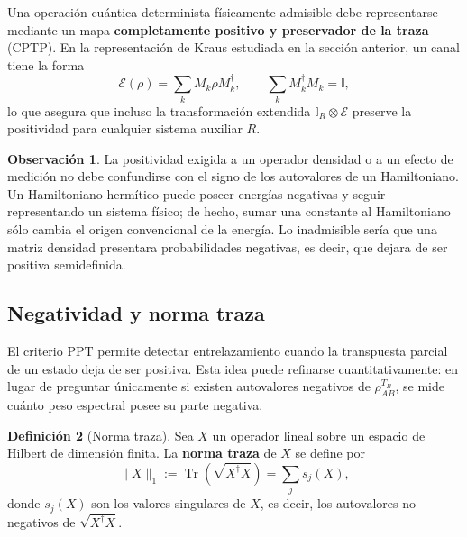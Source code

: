 \documentclass[12pt,a4paper]{article}
\theoremstyle{definition}
\newtheorem{definicion}{Definición}[section]
\newtheorem{observacion}[definicion]{Observación}
\theoremstyle{plain}
\theoremstyle{remark}
\newcommand{\I}{\mathbb{I}}
\newcommand{\TrA}{\operatorname{Tr}}
\begin{document}
Una operación cuántica determinista físicamente admisible debe representarse mediante un mapa \textbf{completamente positivo y preservador de la traza} (CPTP). En la representación de Kraus estudiada en la sección anterior, un canal tiene la forma
\begin{equation*}
    \mathcal{E}(\rho)
    =\sum_k M_k\rho M_k^{\dagger},
    \qquad
    \sum_k M_k^{\dagger}M_k=\I,
\end{equation*}
lo que asegura que incluso la transformación extendida $\I_R\otimes\mathcal{E}$ preserve la positividad para cualquier sistema auxiliar $R$.

\begin{observacion}
La positividad exigida a un operador densidad o a un efecto de medición no debe confundirse con el signo de los autovalores de un Hamiltoniano. Un Hamiltoniano hermítico puede poseer energías negativas y seguir representando un sistema físico; de hecho, sumar una constante al Hamiltoniano sólo cambia el origen convencional de la energía. Lo inadmisible sería que una matriz densidad presentara probabilidades negativas, es decir, que dejara de ser positiva semidefinida.
\end{observacion}


\subsection{Negatividad y norma traza}\label{subsec:negatividad}

El criterio PPT permite detectar entrelazamiento cuando la transpuesta parcial de un estado deja de ser positiva. Esta idea puede refinarse cuantitativamente: en lugar de preguntar únicamente si existen autovalores negativos de $\rho_{AB}^{T_B}$, se mide cuánto peso espectral posee su parte negativa.

\begin{definicion}[Norma traza]
Sea $X$ un operador lineal sobre un espacio de Hilbert de dimensión finita. La \textbf{norma traza} de $X$ se define por
\begin{equation*}
    \|X\|_1
    :=\TrA\!\left(\sqrt{X^{\dagger}X}\right)
    =\sum_j s_j(X),
\end{equation*}
donde $s_j(X)$ son los valores singulares de $X$, es decir, los autovalores no negativos de $\sqrt{X^{\dagger}X}$.
\end{definicion}
\end{document}
